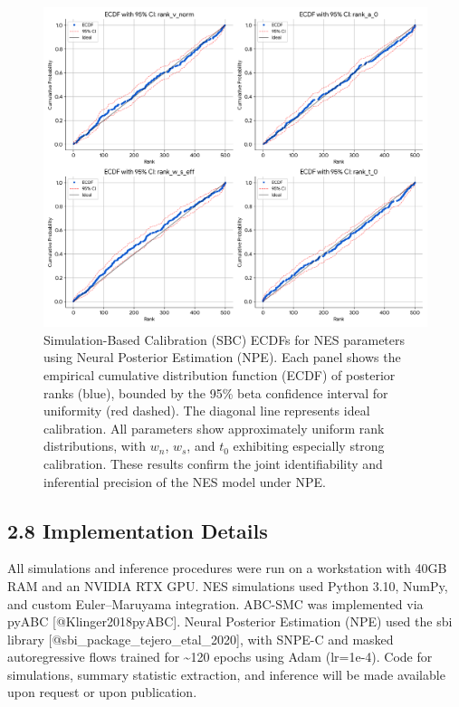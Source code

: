 \documentclass[
  11pt,
]{article}
\begin{document}
\begin{figure}
\centering
\includegraphics[width=1\linewidth,height=\textheight,keepaspectratio]{figures/NPE_SBC_ECDF_6_Param.png}
\caption{Simulation-Based Calibration (SBC) ECDFs for NES parameters
using Neural Posterior Estimation (NPE). Each panel shows the empirical
cumulative distribution function (ECDF) of posterior ranks (blue),
bounded by the 95\% beta confidence interval for uniformity (red
dashed). The diagonal line represents ideal calibration. All parameters
show approximately uniform rank distributions, with \(w_n\), \(w_s\),
and \(t_0\) exhibiting especially strong calibration. These results
confirm the joint identifiability and inferential precision of the NES
model under NPE.}\label{fig:npe_sbc}
\end{figure}

\subsection{2.8 Implementation Details}\label{implementation-details}

All simulations and inference procedures were run on a workstation with
40GB RAM and an NVIDIA RTX GPU. NES simulations used Python 3.10, NumPy,
and custom Euler--Maruyama integration. ABC-SMC was implemented via
pyABC {[}@Klinger2018pyABC{]}. Neural Posterior Estimation (NPE) used
the sbi library {[}@sbi\_package\_tejero\_etal\_2020{]}, with SNPE-C and
masked autoregressive flows trained for \textasciitilde120 epochs using
Adam (lr=1e-4). Code for simulations, summary statistic extraction, and
inference will be made available upon request or upon publication.
\end{document}
